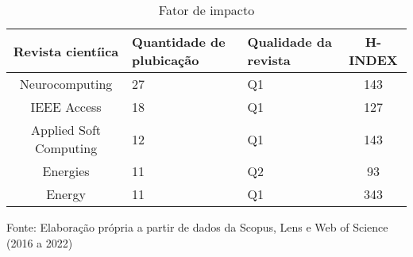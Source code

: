 \begin{table}[H]
	\centering
	\caption{Fator de impacto}\label{tb2}
	\begin{tabular}{@{}cp{3cm}p{3cm}c@{}}
		\toprule
		Revista cientíica      & Quantidade de plubicação & Qualidade da revista & H-INDEX \\\midrule
		Neurocomputing         & 27                         & Q1                     & 143     \\
		IEEE Access            & 18                         & Q1                     & 127     \\
		Applied Soft Computing & 12                         & Q1                     & 143     \\
		Energies               & 11                         & Q2                     & 93      \\
		Energy                 & 11                         & Q1                     & 343     \\ \bottomrule
	\end{tabular}
	
	
	\vspace{0.2cm}
	Fonte: Elaboração própria a partir de dados da Scopus, Lens e Web of Science (2016 a 2022)
\end{table}